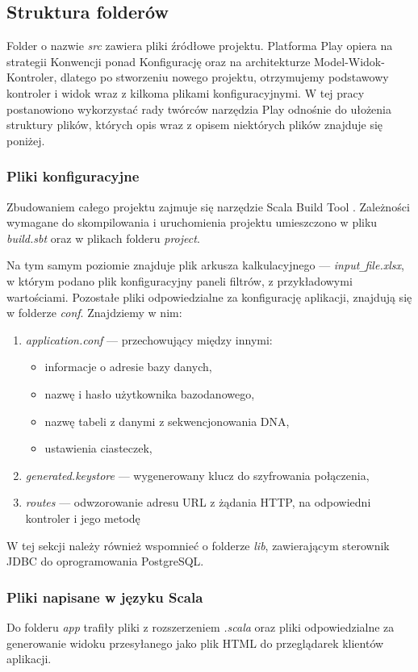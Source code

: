 \documentclass[a4paper,12pt,twoside]{article}
\begin{document}
\subsection{Struktura folderów}
Folder o nazwie \textit{src} zawiera pliki źródłowe projektu.
Platforma Play opiera na strategii Konwencji ponad Konfigurację
oraz na architekturze Model-Widok-Kontroler,
dlatego po stworzeniu nowego projektu,
otrzymujemy podstawowy kontroler i widok wraz z kilkoma plikami konfiguracyjnymi.
W tej pracy postanowiono wykorzystać rady twórców narzędzia Play
odnośnie do ułożenia struktury plików, których opis wraz z opisem niektórych plików znajduje się poniżej.

\subsubsection{Pliki konfiguracyjne}
Zbudowaniem całego projektu zajmuje się narzędzie Scala Build Tool \cite{sbt}.
Zależności wymagane do skompilowania i uruchomienia projektu
umieszczono w pliku \textit{build.sbt} oraz w plikach folderu \textit{project}.

Na tym samym poziomie znajduje plik arkusza kalkulacyjnego —
\textit{input}\verb!_!\textit{file.xlsx}, w którym podano plik konfiguracyjny paneli filtrów,
z przykładowymi wartościami.
Pozostałe pliki odpowiedzialne za konfigurację aplikacji, znajdują
się w folderze \textit{conf}.
Znajdziemy w nim:
\begin{enumerate}[1)]
\item \textit{application.conf} — przechowujący między innymi:
\begin{itemize}
\item informacje o adresie bazy danych,
\item nazwę i hasło użytkownika bazodanowego,
\item nazwę tabeli z danymi z sekwencjonowania DNA,
\item ustawienia ciasteczek,
\end{itemize}
\item \textit{generated.keystore} — wygenerowany klucz do szyfrowania połączenia,
\item \textit{routes} — odwzorowanie adresu URL z żądania HTTP, na odpowiedni kontroler
i jego metodę
\end{enumerate}

W tej sekcji należy również wspomnieć o folderze \textit{lib}, zawierającym
sterownik JDBC do oprogramowania PostgreSQL.

\newpage
\subsubsection{Pliki napisane w języku Scala}
Do folderu \textit{app} trafiły pliki z rozszerzeniem \textit{.scala} oraz pliki
odpowiedzialne za generowanie widoku przesyłanego jako plik HTML do
przeglądarek klientów aplikacji.
\end{document}

